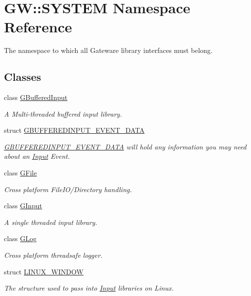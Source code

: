 \hypertarget{namespaceGW_1_1SYSTEM}{}\section{GW\+:\+:S\+Y\+S\+T\+EM Namespace Reference}
\label{namespaceGW_1_1SYSTEM}


The namespace to which all Gateware library interfaces must belong.  


\subsection*{Classes}
\begin{DoxyCompactItemize}
\item 
class \hyperlink{classGW_1_1SYSTEM_1_1GBufferedInput}{G\+Buffered\+Input}
\begin{DoxyCompactList}\small\item\em A Multi-\/threaded buffered input library. \end{DoxyCompactList}\item 
struct \hyperlink{structGW_1_1SYSTEM_1_1GBUFFEREDINPUT__EVENT__DATA}{G\+B\+U\+F\+F\+E\+R\+E\+D\+I\+N\+P\+U\+T\+\_\+\+E\+V\+E\+N\+T\+\_\+\+D\+A\+TA}
\begin{DoxyCompactList}\small\item\em \hyperlink{structGW_1_1SYSTEM_1_1GBUFFEREDINPUT__EVENT__DATA}{G\+B\+U\+F\+F\+E\+R\+E\+D\+I\+N\+P\+U\+T\+\_\+\+E\+V\+E\+N\+T\+\_\+\+D\+A\+TA} will hold any information you may need about an \hyperlink{classInput}{Input} Event. \end{DoxyCompactList}\item 
class \hyperlink{classGW_1_1SYSTEM_1_1GFile}{G\+File}
\begin{DoxyCompactList}\small\item\em Cross platform File\+I\+O/\+Directory handling. \end{DoxyCompactList}\item 
class \hyperlink{classGW_1_1SYSTEM_1_1GInput}{G\+Input}
\begin{DoxyCompactList}\small\item\em A single threaded input library. \end{DoxyCompactList}\item 
class \hyperlink{classGW_1_1SYSTEM_1_1GLog}{G\+Log}
\begin{DoxyCompactList}\small\item\em Cross platform threadsafe logger. \end{DoxyCompactList}\item 
struct \hyperlink{structGW_1_1SYSTEM_1_1LINUX__WINDOW}{L\+I\+N\+U\+X\+\_\+\+W\+I\+N\+D\+OW}
\begin{DoxyCompactList}\small\item\em The structure used to pass into \hyperlink{classInput}{Input} libraries on Linux. \end{DoxyCompactList}\end{DoxyCompactItemize}
